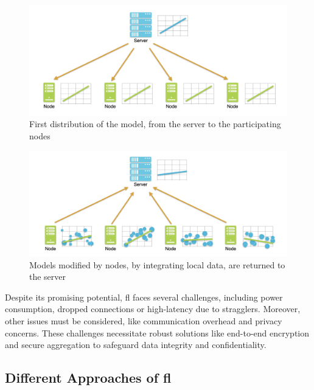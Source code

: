 \documentclass[conference]{IEEEtran}
\begin{document}
\begin{figure}[t]
    \centering
    \includegraphics[width=\linewidth]{FL-phase1.jpg}
    \vspace*{-.8cm}
    \caption{First distribution of the model, from the server to the participating nodes}
    \label{fig:fl-phase1}
\end{figure}

\begin{figure}[t]
    \centering
    \vspace*{-.4cm}
    \includegraphics[width=\linewidth]{FL-phase2.jpg}
    \vspace*{-.8cm}
    \caption{Models modified by nodes, by integrating local data, are returned to the server}
    \label{fig:fl-phase2}
\end{figure}

Despite its promising potential, \gls{fl} faces several challenges, including power consumption, dropped connections or high-latency due to stragglers.
Moreover, other issues must be considered, like communication overhead and privacy concerns. %
These challenges necessitate robust solutions like end-to-end encryption and secure aggregation to safeguard data integrity and confidentiality.

\subsection{Different Approaches of \gls{fl}}
\end{document}
